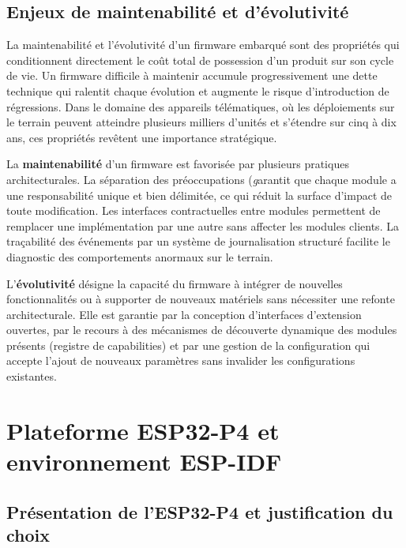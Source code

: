 \subsection{Enjeux de maintenabilité et d'évolutivité}
\label{subsec:maintenabilite}

La maintenabilité et l'évolutivité d'un firmware embarqué sont des propriétés
qui conditionnent directement le coût total de possession d'un produit sur
son cycle de vie. Un firmware difficile à maintenir accumule progressivement
une dette technique qui ralentit chaque évolution et augmente le risque
d'introduction de régressions. Dans le domaine des appareils télématiques,
où les déploiements sur le terrain peuvent atteindre plusieurs milliers
d'unités et s'étendre sur cinq à dix ans, ces propriétés revêtent une
importance stratégique.

La \textbf{maintenabilité} d'un firmware est favorisée par plusieurs
pratiques architecturales. La séparation des préoccupations (\textit garantit que chaque module a une responsabilité unique et bien
délimitée, ce qui réduit la surface d'impact de toute modification. Les
interfaces contractuelles entre modules permettent de remplacer une
implémentation par une autre sans affecter les modules clients. La
traçabilité des événements par un système de journalisation structuré
facilite le diagnostic des comportements anormaux sur le terrain.

L'\textbf{évolutivité} désigne la capacité du firmware à intégrer de
nouvelles fonctionnalités ou à supporter de nouveaux matériels sans
nécessiter une refonte architecturale. Elle est garantie par la conception
d'interfaces d'extension ouvertes, par le recours à des mécanismes de
découverte dynamique des modules présents (registre de capabilities) et
par une gestion de la configuration qui accepte l'ajout de nouveaux
paramètres sans invalider les configurations existantes.
\newpage
\section{Plateforme ESP32-P4 et environnement ESP-IDF}
\label{sec:esp32}


\subsection{Présentation de l'ESP32-P4 et justification du choix}
\label{subsec:esp32p4}

